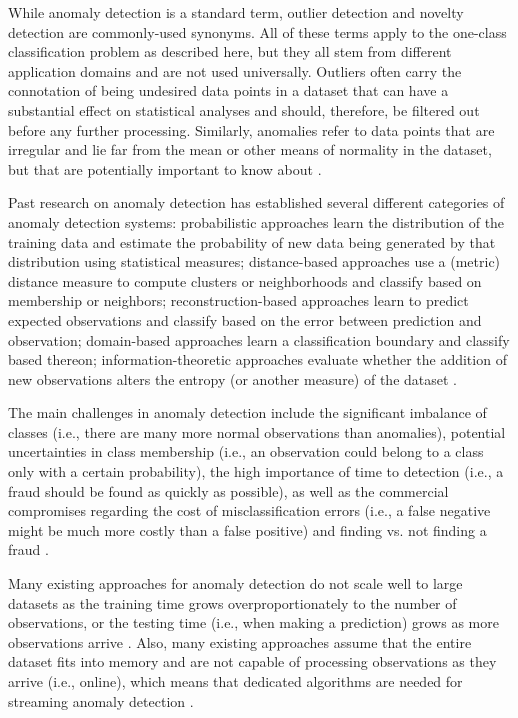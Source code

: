 While anomaly detection is a standard term, outlier detection and novelty detection are commonly-used synonyms. All of these terms apply to the one-class classification problem as described here, but they all stem from different application domains and are not used universally. Outliers often carry the connotation of being undesired data points in a dataset that can have a substantial effect on statistical analyses and should, therefore, be filtered out before any further processing. Similarly, anomalies refer to data points that are irregular and lie far from the mean or other means of normality in the dataset, but that are potentially important to know about \citep{pimentel_review_2014}.

Past research on anomaly detection has established several different categories of anomaly detection systems: probabilistic approaches learn the distribution of the training data and estimate the probability of new data being generated by that distribution using statistical measures; distance-based approaches use a (metric) distance measure to compute clusters or neighborhoods and classify based on membership or neighbors; reconstruction-based approaches learn to predict expected observations and classify based on the error between prediction and observation; domain-based approaches learn a classification boundary and classify based thereon; information-theoretic approaches evaluate whether the addition of new observations alters the entropy (or another measure) of the dataset \citep{pimentel_review_2014}.

The main challenges in anomaly detection include the significant imbalance of classes (i.e., there are many more normal observations than anomalies), potential uncertainties in class membership (i.e., an observation could belong to a class only with a certain probability), the high importance of time to detection (i.e., a fraud should be found as quickly as possible), as well as the commercial compromises regarding the cost of misclassification errors (i.e., a false negative might be much more costly than a false positive) and finding vs. not finding a fraud \citep{bolton_statistical_2002}.

Many existing approaches for anomaly detection do not scale well to large datasets as the training time grows overproportionately to the number of observations, or the testing time (i.e., when making a prediction) grows as more observations arrive \citep{schneider_expected_2016}. Also, many existing approaches assume that the entire dataset fits into memory and are not capable of processing observations as they arrive (i.e., online), which means that dedicated algorithms are needed for streaming anomaly detection \citep{dos_santos_teixeira_data_2010}.

